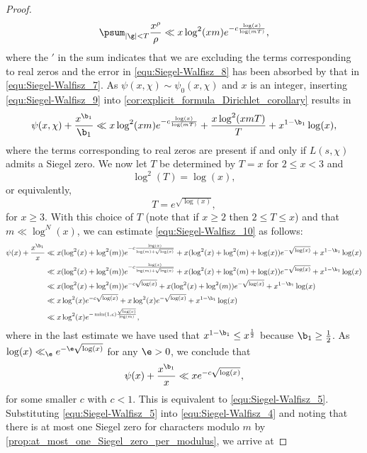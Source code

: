 \begin{proof}
\begin{equation}
          \psum_{|\g| < T}\frac{x^{\rho}}{\rho} \ll x\log^{2}(xm)e^{-c\frac{\log(x)}{\log(mT)}},
        \end{equation}
        where the $'$ in the sum indicates that we are excluding the terms corresponding to real zeros and the error in \cref{equ:Siegel-Walfisz_8} has been absorbed by that in \cref{equ:Siegel-Walfisz_7}. As $\psi(x,\chi) \sim \psi_{0}(x,\chi)$ and $x$ is an integer, inserting \cref{equ:Siegel-Walfisz_9} into \cref{cor:explicit_formula_Dirichlet_corollary} results in
        \begin{equation}\label{equ:Siegel-Walfisz_10}
          \psi(x,\chi)+\frac{x^{\b_{1}}}{\b_{1}} \ll x\log^{2}(xm)e^{-c\frac{\log(x)}{\log(mT)}}+\frac{x\log^{2}(xmT)}{T}+x^{1-\b_{1}}\log(x),
        \end{equation}
        where the terms corresponding to real zeros are present if and only if $L(s,\chi)$ admits a Siegel zero. We now let $T$ be determined by $T = x$ for $2 \le x < 3$ and
        \[
          \log^{2}(T) = \log(x),
        \]
        or equivalently,
        \[
          T = e^{\sqrt{\log(x)}},
        \]
        for $x \ge 3$. With this choice of $T$ (note that if $x \ge 2$ then $2 \le T \le x$) and that $m \ll \log^{N}(x)$, we can estimate \cref{equ:Siegel-Walfisz_10} as follows:
        \begin{align*}
          \psi(x)+\frac{x^{\b_{1}}}{x} &\ll x(\log^{2}(x)+\log^{2}(m))e^{-c\frac{\log(x)}{\log(m)+\sqrt{\log(x)}}}+x(\log^{2}(x)+\log^{2}(m)+\log(x))e^{-\sqrt{\log(x)}}+x^{1-\b_{1}}\log(x) \\
          &\ll x(\log^{2}(x)+\log^{2}(m))e^{-c\frac{\log(x)}{\log(m)+\sqrt{\log(x)}}}+x(\log^{2}(x)+\log^{2}(m)+\log(x))e^{-\sqrt{\log(x)}}+x^{1-\b_{1}}\log(x) \\
          &\ll x(\log^{2}(x)+\log^{2}(m))e^{-c\sqrt{\log(x)}}+x(\log^{2}(x)+\log^{2}(m))e^{-\sqrt{\log(x)}}+x^{1-\b_{1}}\log(x) \\
          &\ll x\log^{2}(x)e^{-c\sqrt{\log(x)}}+x\log^{2}(x)e^{-\sqrt{\log(x)}}+x^{1-\b_{1}}\log(x) \\
          &\ll x\log^{2}(x)e^{-\min(1,c)\frac{\sqrt{\log(x)}}{\log(m)}},
        \end{align*}
        where in the last estimate we have used that $x^{1-\b_{1}} \le x^{\frac{1}{2}}$ because $\b_{1} \ge \frac{1}{2}$. As $\log(x) \ll_{\e} e^{-\e\sqrt{\log(x)}}$ for any $\e > 0$, we conclude that
        \[
          \psi(x)+\frac{x^{\b_{1}}}{x} \ll xe^{-c\sqrt{\log(x)}},
        \]
        for some smaller $c$ with $c < 1$. This is equivalent to \cref{equ:Siegel-Walfisz_5}. Substituting \cref{equ:Siegel-Walfisz_5} into \cref{equ:Siegel-Walfisz_4} and noting that there is at most one Siegel zero for characters modulo $m$ by \cref{prop:at_most_one_Siegel_zero_per_modulus}, we arrive at

\end{proof}
